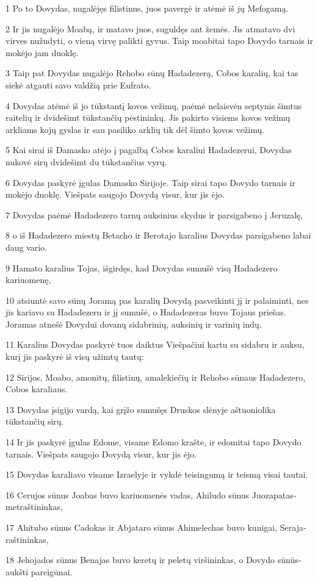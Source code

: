\par 1 Po to Dovydas, nugalėjęs filistinus, juos pavergė ir atėmė iš jų Mefogamą. 
\par 2 Ir jis nugalėjo Moabą, ir matavo juos, suguldęs ant žemės. Jis atmatavo dvi virves nužudyti, o vieną virvę palikti gyvus. Taip moabitai tapo Dovydo tarnais ir mokėjo jam duoklę. 
\par 3 Taip pat Dovydas nugalėjo Rehobo sūnų Hadadezerą, Cobos karalių, kai tas siekė atgauti savo valdžią prie Eufrato. 
\par 4 Dovydas atėmė iš jo tūkstantį kovos vežimų, paėmė nelaisvėn septynis šimtus raitelių ir dvidešimt tūkstančių pėstininkų. Jis pakirto visiems kovos vežimų arkliams kojų gyslas ir sau pasiliko arklių tik dėl šimto kovos vežimų. 
\par 5 Kai sirai iš Damasko atėjo į pagalbą Cobos karaliui Hadadezerui, Dovydas nukovė sirų dvidešimt du tūkstančius vyrų. 
\par 6 Dovydas paskyrė įgulas Damasko Sirijoje. Taip sirai tapo Dovydo tarnais ir mokėjo duoklę. Viešpats saugojo Dovydą visur, kur jis ėjo. 
\par 7 Dovydas paėmė Hadadezero tarnų auksinius skydus ir parsigabeno į Jeruzalę, 
\par 8 o iš Hadadezero miestų Betacho ir Berotajo karalius Dovydas parsigabeno labai daug vario. 
\par 9 Hamato karalius Tojas, išgirdęs, kad Dovydas sumušė visą Hadadezero kariuomenę, 
\par 10 atsiuntė savo sūnų Joramą pas karalių Dovydą pasveikinti jį ir palaiminti, nes jis kariavo su Hadadezeru ir jį sumušė, o Hadadezeras buvo Tojaus priešas. Joramas atnešė Dovydui dovanų sidabrinių, auksinių ir varinių indų. 
\par 11 Karalius Dovydas paskyrė tuos daiktus Viešpačiui kartu su sidabru ir auksu, kurį jis paskyrė iš visų užimtų tautų: 
\par 12 Sirijos, Moabo, amonitų, filistinų, amalekiečių ir Rehobo sūnaus Hadadezero, Cobos karaliaus. 
\par 13 Dovydas įsigijo vardą, kai grįžo sumušęs Druskos slėnyje aštuoniolika tūkstančių sirų. 
\par 14 Ir jis paskyrė įgulas Edome, visame Edomo krašte, ir edomitai tapo Dovydo tarnais. Viešpats saugojo Dovydą visur, kur jis ėjo. 
\par 15 Dovydas karaliavo visame Izraelyje ir vykdė teisingumą ir teismą visai tautai. 
\par 16 Cerujos sūnus Joabas buvo kariuomenės vadas, Ahiludo sūnus Juozapatas­metraštininkas, 
\par 17 Ahitubo sūnus Cadokas ir Abjataro sūnus Ahimelechas buvo kunigai, Seraja­raštininkas, 
\par 18 Jehojados sūnus Benajas buvo keretų ir peletų viršininkas, o Dovydo sūnūs­aukšti pareigūnai.



